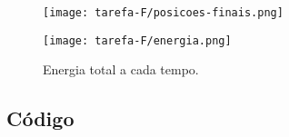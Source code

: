\begin{figure}[h!]
    \centering
    \texttt{[image: tarefa-F/posicoes-finais.png]}
    \caption{}
    \label{fig:posicoes-finais-f}
\end{figure}

\begin{figure}[h!]
    \centering
    \texttt{[image: tarefa-F/energia.png]}
    \caption{Energia total a cada tempo.}
    \label{fig:energia-f}
\end{figure}

\subsection*{Código}
